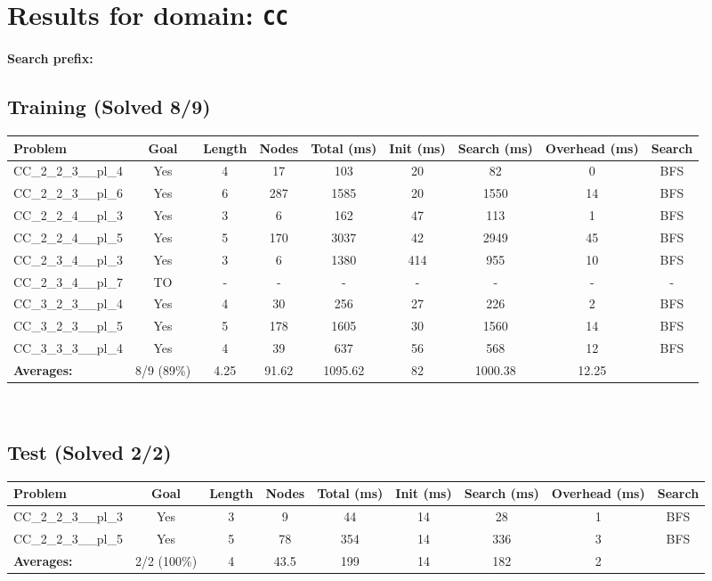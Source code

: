 \documentclass{article}
\begin{document}
\section*{Results for domain: \texttt{CC}}
\textbf{Search prefix:} 
\\[0.5cm]
\subsection*{Training (Solved 8/9)}
\begin{tabular}{lcccccccc}
\toprule
Problem & Goal & Length & Nodes & Total (ms) & Init (ms) & Search (ms) & Overhead (ms) & Search \\
\midrule
CC\_2\_2\_3\_\_pl\_4 & Yes & 4 & 17 & 103 & 20 & 82 & 0 & BFS \\
CC\_2\_2\_3\_\_pl\_6 & Yes & 6 & 287 & 1585 & 20 & 1550 & 14 & BFS \\
CC\_2\_2\_4\_\_pl\_3 & Yes & 3 & 6 & 162 & 47 & 113 & 1 & BFS \\
CC\_2\_2\_4\_\_pl\_5 & Yes & 5 & 170 & 3037 & 42 & 2949 & 45 & BFS \\
CC\_2\_3\_4\_\_pl\_3 & Yes & 3 & 6 & 1380 & 414 & 955 & 10 & BFS \\
CC\_2\_3\_4\_\_pl\_7 & TO & - & - & - & - & - & - & - \\
CC\_3\_2\_3\_\_pl\_4 & Yes & 4 & 30 & 256 & 27 & 226 & 2 & BFS \\
CC\_3\_2\_3\_\_pl\_5 & Yes & 5 & 178 & 1605 & 30 & 1560 & 14 & BFS \\
CC\_3\_3\_3\_\_pl\_4 & Yes & 4 & 39 & 637 & 56 & 568 & 12 & BFS \\
\textbf{Averages:} & 8/9 (89\%) & 4.25 & 91.62 & 1095.62 & 82 & 1000.38 & 12.25 & \\
\bottomrule
\end{tabular}
\\[0.7cm]
\subsection*{Test (Solved 2/2)}
\begin{tabular}{lcccccccc}
\toprule
Problem & Goal & Length & Nodes & Total (ms) & Init (ms) & Search (ms) & Overhead (ms) & Search \\
\midrule
CC\_2\_2\_3\_\_pl\_3 & Yes & 3 & 9 & 44 & 14 & 28 & 1 & BFS \\
CC\_2\_2\_3\_\_pl\_5 & Yes & 5 & 78 & 354 & 14 & 336 & 3 & BFS \\
\textbf{Averages:} & 2/2 (100\%) & 4 & 43.5 & 199 & 14 & 182 & 2 & \\
\bottomrule
\end{tabular}
\\[0.7cm]
\end{document}

